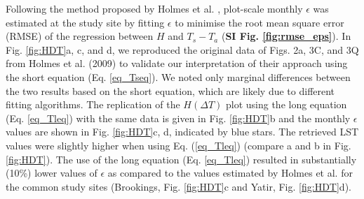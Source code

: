 \documentclass[fleqn,10pt]{wlscirep}
\begin{document}
Following the method proposed by Holmes et al. \cite{holmes_land_2009, holmes_cloud_2016}, plot-scale monthly $\epsilon$ was estimated at the study site by fitting $\epsilon$ to minimise the root mean square error (RMSE) of the regression between $H$ and $T_s - T_a$ (\textbf{SI Fig. \ref{fig:rmse_eps}}). In Fig. \ref{fig:HDT}a, c, and d, we reproduced the original data of Figs. 2a, 3C, and 3Q from Holmes et al. (2009) \cite{holmes_land_2009} to validate our interpretation of their approach using the short equation (Eq. \ref{eq_Tseq}). We noted only marginal differences between the two results based on the short equation, which are likely due to different fitting algorithms. 
The replication of the $H (\Delta T)$ plot using the long equation (Eq. \ref{eq_Tleq}) with the same data is given in Fig. \ref{fig:HDT}b and the monthly $\epsilon$ values are shown in Fig. \ref{fig:HDT}c, d, indicated by blue stars.
 The retrieved LST values were slightly higher when using Eq. (\ref{eq_Tleq}) (compare a and b in Fig. \ref{fig:HDT}). The use of the long equation (Eq. \ref{eq_Tleq}) resulted in substantially (10\%) lower values of $\epsilon$ as compared to the values estimated by Holmes et al.\cite{holmes_land_2009} for the common study sites (Brookings, Fig. \ref{fig:HDT}c and Yatir, Fig. \ref{fig:HDT}d). 
\end{document}
